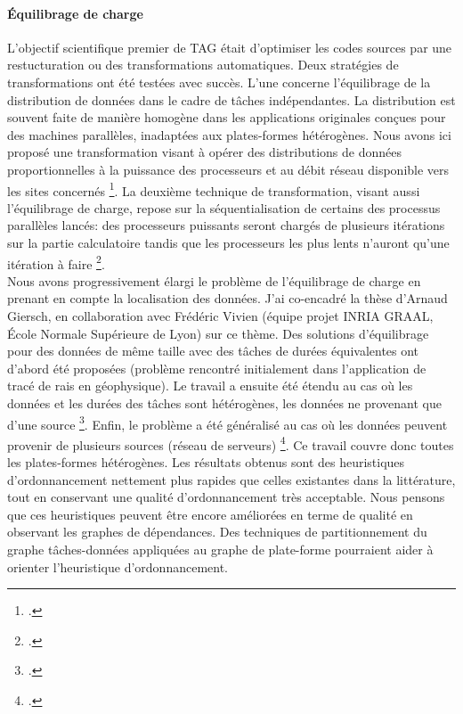 \documentclass[11pt]{article}
\begin{document}
\paragraph{\'{E}quilibrage de charge} 

L'objectif scientifique premier de TAG était d'optimiser les codes sources par une restucturation ou 
des transformations automatiques. Deux stratégies de transformations ont été testées avec succès.
L'une concerne l'équilibrage de la distribution de données dans le cadre de 
t\^{a}ches indépendantes.
La distribution est souvent faite de manière homogène dans les applications originales conçues
pour des machines parallèles, inadaptées aux plates-formes hétérogènes.
Nous avons ici proposé une transformation visant à opérer des
distributions de données proportionnelles à la puissance des
processeurs et au débit réseau disponible vers les sites concernés 
\footcite{icps-2002-62,icps-2003-75,icps-2004-125}. 
La deuxième technique de transformation, visant aussi l'équilibrage de charge,
repose sur la séquentialisation de certains des processus parallèles lancés: 
des processeurs puissants seront chargés de plusieurs itérations sur la partie calculatoire tandis que
les processeurs les plus lents n'auront qu'une itération à faire \footcite{icps-2002-49}.\\



Nous avons progressivement élargi le problème de l'équilibrage de charge en prenant en compte 
la localisation des données. J'ai co-encadré la thèse d'Arnaud Giersch, en collaboration avec 
Frédéric Vivien (équipe projet INRIA GRAAL, \'{E}cole Normale Supérieure de Lyon) sur ce thème.
Des solutions d'équilibrage pour des données de même taille avec des tâches de durées équivalentes 
ont d'abord été proposées (problème rencontré initialement dans l'application de tracé de rais en géophysique). 
Le travail a ensuite été étendu au cas où les données et les durées des tâches sont hétérogènes, 
les données ne provenant que d'une source \footcite{icps-2004-125}. 
Enfin, le problème a été généralisé au cas où les données peuvent provenir de plusieurs sources 
(réseau de serveurs) \footcite{icps-2004-112}.
Ce travail couvre donc toutes les plates-formes hétérogènes. 
Les résultats obtenus sont des heuristiques d'ordonnancement nettement plus rapides que celles existantes dans la littérature, tout en conservant une qualité d'ordonnancement très acceptable.
Nous pensons que ces heuristiques peuvent être encore améliorées en terme 
de qualité en observant les graphes de dépendances.
Des techniques de partitionnement du graphe tâches-données appliquées au graphe de plate-forme
pourraient aider à orienter l'heuristique d'ordonnancement. 
\end{document}
